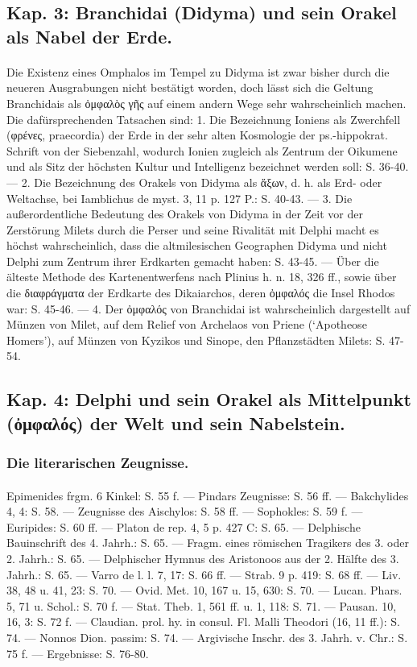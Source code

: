\documentclass[a4paper, 11pt, oneside]{article}
\begin{document}
\subsection*{Kap. 3: Branchidai (Didyma) und sein Orakel als Nabel der Erde.}
\paragraph{}
Die Existenz eines Omphalos im Tempel zu Didyma ist zwar bisher durch die neueren Ausgrabungen nicht bestätigt worden, doch lässt sich die Geltung Branchidais als ὀμφαλὸς γῆς auf einem andern Wege sehr wahrscheinlich machen. Die dafürsprechenden Tatsachen sind: 1. Die Bezeichnung Ioniens als Zwerchfell (φρένες, praecordia) der Erde in der sehr alten Kosmologie der ps.-hippokrat. Schrift von der Siebenzahl, wodurch Ionien zugleich als Zentrum der Oikumene und als Sitz der höchsten Kultur und Intelligenz bezeichnet werden soll: S. 36-40. --- 2. Die Bezeichnung des Orakels von Didyma als ἄξων, d. h. als Erd- oder Weltachse, bei Iamblichus de myst. 3, 11 p. 127 P.: S. 40-43. --- 3. Die außerordentliche Bedeutung des Orakels von Didyma in der Zeit vor der Zerstörung Milets durch die Perser und seine Rivalität mit Delphi macht es höchst wahrscheinlich, dass die altmilesischen Geographen Didyma und nicht Delphi zum Zentrum ihrer Erdkarten gemacht haben: S. 43-45. --- Über die älteste Methode des Kartenentwerfens nach Plinius h. n. 18, 326 ff., sowie über die διαφράγματα der Erdkarte des Dikaiarchos, deren ὀμφαλός die Insel Rhodos war: S. 45-46. --- 4. Der ὀμφαλός von Branchidai ist wahrscheinlich dargestellt auf Münzen von Milet, auf dem Relief von Archelaos von Priene (`Apotheose Homers'), auf Münzen von Kyzikos und Sinope, den Pflanzstädten Milets: S. 47-54.

\subsection*{Kap. 4: Delphi und sein Orakel als Mittelpunkt (ὀμφαλός) der Welt und sein Nabelstein.}
\subsubsection*{Die literarischen Zeugnisse.}
\paragraph{}
Epimenides frgm. 6 Kinkel: S. 55 f. --- Pindars Zeugnisse: S. 56 ff. --- Bakchylides 4, 4: S. 58. --- Zeugnisse des Aischylos: S. 58 ff. --- Sophokles: S. 59 f. --- Euripides: S. 60 ff. --- Platon de rep. 4, 5 p. 427 C: S. 65. --- Delphische Bauinschrift des 4. Jahrh.: S. 65. --- Fragm. eines römischen Tragikers des 3. oder 2. Jahrh.: S. 65. --- Delphischer Hymnus des Aristonoos aus der 2. Hälfte des 3. Jahrh.: S. 65. --- Varro de l. l. 7, 17: S. 66 ff. --- Strab. 9 p. 419: S. 68 ff. --- Liv. 38, 48 u. 41, 23: S. 70. --- Ovid. Met. 10, 167 u. 15, 630: S. 70. --- Lucan. Phars. 5, 71 u. Schol.: S. 70 f. --- Stat. Theb. 1, 561 ff. u. 1, 118: S. 71. --- Pausan. 10, 16, 3: S. 72 f. --- Claudian. prol. hy. in consul. Fl. Malli Theodori (16, 11 ff.): S. 74. --- Nonnos Dion. passim: S. 74. --- Argivische Inschr. des 3. Jahrh. v. Chr.: S. 75 f. --- Ergebnisse: S. 76-80.
\end{document}
